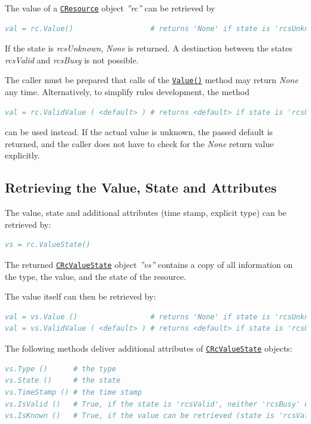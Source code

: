 \documentclass[12pt,english,parskip=half,headheight=19pt]{scrreprt}
\newcommand{\refapic}[1]{\href{home2l-api_c/index.html}{\mbox{\texttt{#1}}}}            %
\newcommand{\refapipython}[1]{\href{home2l-api_python/index.html}{\mbox{\texttt{#1}}}}  %
\begin{document}
The value of a \refapipython{CResource} object \textit{''rc''} can be retrieved by
\begin{lstlisting}[language=comments]
val = rc.Value()                  # returns 'None' if state is 'rcsUnknown'
\end{lstlisting}

If the state is \textit{rcsUnknown}, \textit{None} is returned. A destinction between the states \textit{rcsValid} and \textit{rcsBusy} is not possible.

The caller must be prepared that calls of the \refapipython{Value()} method may return \textit{None} any time.
Alternatively, to simplify rules development, the method
\begin{lstlisting}[language=comments]
val = rc.ValidValue ( <default> ) # returns <default> if state is 'rcsUnknown'
\end{lstlisting}
can be used instead. If the actual value is unknown, the passed default is returned, and the caller does not have to check for the \textit{None} return value explicitly.



\subsection{Retrieving the Value, State and Attributes}

The value, state and additional attributes (time stamp, explicit type) can be retrieved by:
\begin{lstlisting}[language=comments]
vs = rc.ValueState()
\end{lstlisting}

The returned \refapic{CRcValueState} object \textit{''vs''} contains a copy of all information on the type, the value, and the state of the resource.

The value itself can then be retrieved by:
\begin{lstlisting}[language=comments]
val = vs.Value ()                 # returns 'None' if state is 'rcsUnknown'
val = vs.ValidValue ( <default> ) # returns <default> if state is 'rcsUnknown'
\end{lstlisting}

The following methods deliver additional attributes of \refapic{CRcValueState} objects:
\begin{lstlisting}[language=comments]
vs.Type ()      # the type
vs.State ()     # the state
vs.TimeStamp () # the time stamp
vs.IsValid ()   # True, if the state is 'rcsValid', neither 'rcsBusy' nor 'rcsUnknown'.
vs.IsKnown ()   # True, if the value can be retrieved (state is 'rcsValid' or 'rcsBusy')
\end{lstlisting}
\end{document}

